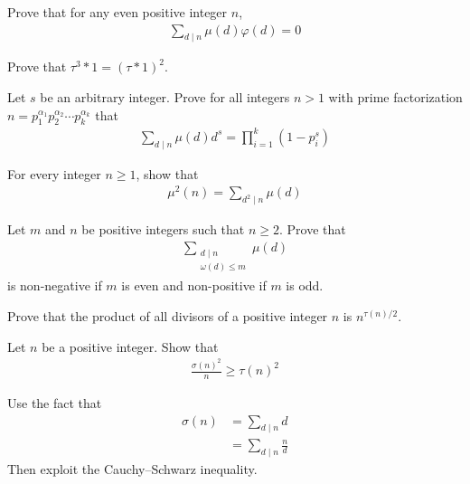\begin{problem}
	Prove that for any even positive integer $n$,
		\begin{align*}
			\sum_{d\mid n} \mu(d)\varphi(d) = 0
		\end{align*}
\end{problem}

\begin{problem}
	Prove that $\tau^3 \ast 1 = (\tau\ast 1)^2$.
\end{problem}

\begin{problem}
	Let $s$ be an arbitrary integer. Prove for all integers $n >1$ with prime factorization $n= p_1^{\alpha_1} p_2^{\alpha_2} \cdots p_k^{\alpha_k}$ that
		\begin{align*}
		\sum_{d\mid n} \mu (d) d^s = \prod_{i=1}^{k} (1-p_i^s)
		\end{align*}
\end{problem}

\begin{problem}
	For every integer $n \geq 1$, show that
		\begin{align*}
			\mu^2(n)=\sum_{d^2\mid n}\mu(d)
		\end{align*}
\end{problem}

\begin{problem}
	Let $m$ and $n$ be positive integers such that $n \geq 2$. Prove that
		\begin{align*}
			\sum\limits_{\substack{d\mid n \\ \omega(d) \leq m}} \mu(d)
		\end{align*}
	is non-negative if $m$ is even and non-positive if $m$ is odd.
\end{problem}

\begin{problem}
	Prove that the product of all divisors of a positive integer $n$ is $n^{\tau(n)/2}$.
\end{problem}

\begin{problem}
	Let $n$ be a positive integer. Show that
		\begin{align*}
			\frac{\sigma(n)^2}{n} \geq \tau(n)^2
		\end{align*}
\end{problem}

\begin{hint}
	Use the fact that
		\begin{align*}
			\sigma(n)
				& =\sum\limits_{d\mid n} d\\
				& =  \sum\limits_{d\mid n} \frac{n}{d}
		\end{align*}
	Then exploit the Cauchy--Schwarz inequality.
\end{hint}

